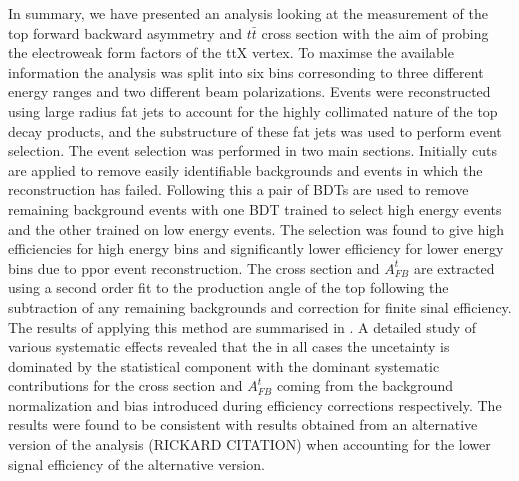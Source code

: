 In summary, we have presented an analysis looking at the measurement of the top forward backward asymmetry and $t\bar{t}$ cross section with the aim of probing the electroweak form factors of the ttX vertex. To maximse the available information the analysis was split into six bins corresonding to three different energy ranges and two different beam polarizations. Events were reconstructed using large radius fat jets to account for the highly collimated nature of the top decay products, and the substructure of these fat jets was used to perform event selection. The event selection was performed in two main sections. Initially cuts are applied to remove easily identifiable backgrounds and events in which the reconstruction has failed. Following this a pair of \ac{BDT}s are used to remove remaining background events with one \ac{BDT} trained to select high energy events and the other trained on low energy events. The selection was found to give high efficiencies for high energy bins and significantly lower efficiency for lower energy bins due to ppor event reconstruction. The cross section and $A_{FB}^t$ are extracted using a second order fit to the production angle of the top following the subtraction of any remaining backgrounds and correction for finite sinal efficiency. The results of applying this method are summarised in . A detailed study of various systematic effects revealed that the in all cases the uncetainty is dominated by the statistical component with the dominant systematic contributions for the cross section and $A_{FB}^t$ coming from the background normalization and bias introduced during efficiency corrections respectively. The results were found to be consistent with results obtained from an alternative version of the analysis (RICKARD CITATION) when accounting for the lower signal efficiency of the alternative version.

